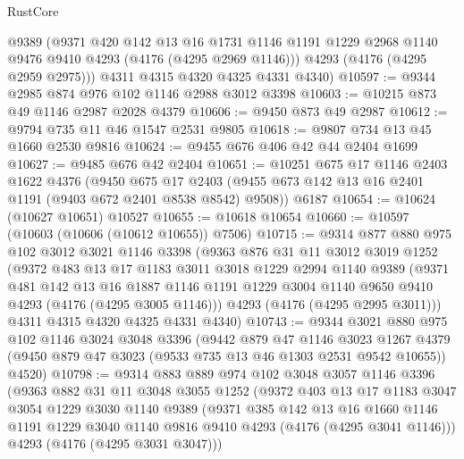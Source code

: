 \begin{lexlean}{RustCore}
\begin{coremodule}
        @9389
        (@9371
          @420
          @142
          @13
          @16
          @1731
          @1146
          @1191
          @1229
          @2968
          @1140
          @9476
          @9410
          @4293
          (@4176 (@4295 @2969 @1146)))
        @4293
        (@4176 (@4295 @2959 @2975)))
      @4311
      @4315
      @4320
      @4325
      @4331
      @4340)
@10597 := @9344 @2985 @874 @976 @102 @1146 @2988 @3012 @3398
@10603 := @10215 @873 @49 @1146 @2987 @2028 @4379
@10606 := @9450 @873 @49 @2987
@10612 := @9794 @735 @11 @46 @1547 @2531 @9805
@10618 := @9807 @734 @13 @45 @1660 @2530 @9816
@10624 := @9455 @676 @406 @42 @44 @2404 @1699
@10627 := @9485 @676 @42 @2404
@10651 := @10251
    @675
    @17
    @1146
    @2403
    @1622
    @4376
    (@9450
      @675
      @17
      @2403
      (@9455 @673 @142 @13 @16 @2401 @1191 (@9403 @672 @2401 @8538 @8542) @9508))
    @6187
@10654 := @10624 (@10627 @10651) @10527
@10655 := @10618 @10654
@10660 := @10597 (@10603 (@10606 (@10612 @10655)) @7506)
@10715 := @9314
    @877
    @880
    @975
    @102
    @3012
    @3021
    @1146
    @3398
    (@9363
      @876
      @31
      @11
      @3012
      @3019
      @1252
      (@9372
        @483
        @13
        @17
        @1183
        @3011
        @3018
        @1229
        @2994
        @1140
        @9389
        (@9371
          @481
          @142
          @13
          @16
          @1887
          @1146
          @1191
          @1229
          @3004
          @1140
          @9650
          @9410
          @4293
          (@4176 (@4295 @3005 @1146)))
        @4293
        (@4176 (@4295 @2995 @3011)))
      @4311
      @4315
      @4320
      @4325
      @4331
      @4340)
@10743 := @9344
    @3021
    @880
    @975
    @102
    @1146
    @3024
    @3048
    @3396
    (@9442
      @879
      @47
      @1146
      @3023
      @1267
      @4379
      (@9450 @879 @47 @3023 (@9533 @735 @13 @46 @1303 @2531 @9542 @10655))
      @4520)
@10798 := @9314
    @883
    @889
    @974
    @102
    @3048
    @3057
    @1146
    @3396
    (@9363
      @882
      @31
      @11
      @3048
      @3055
      @1252
      (@9372
        @403
        @13
        @17
        @1183
        @3047
        @3054
        @1229
        @3030
        @1140
        @9389
        (@9371
          @385
          @142
          @13
          @16
          @1660
          @1146
          @1191
          @1229
          @3040
          @1140
          @9816
          @9410
          @4293
          (@4176 (@4295 @3041 @1146)))
        @4293
        (@4176 (@4295 @3031 @3047)))

\end{coremodule}
\end{lexlean}
